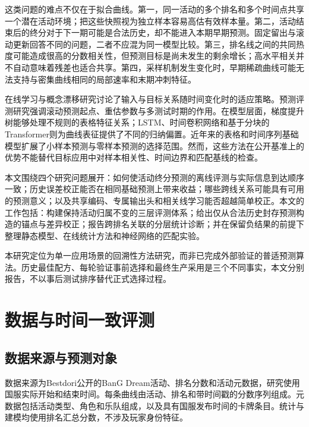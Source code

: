 \documentclass[a4paper,11pt,fontset=none]{ctexart}
\begin{document}
这类问题的难点不仅在于拟合曲线。第一，同一活动的多个排名和多个时间点共享一个潜在活动环境；把这些快照视为独立样本容易高估有效样本量。第二，活动结束后的终分对于下一期可能是合法历史，却不能进入本期早期预测。固定留出与滚动更新回答不同的问题，二者不应混为同一模型比较。第三，排名线之间的共同热度可能造成很高的分数相关性，但预测目标是尚未发生的剩余增长；高水平相关并不自动意味着残差也适合共享。第四，采样机制发生变化时，早期稀疏曲线可能无法支持与密集曲线相同的局部速率和末期冲刺特征。

在线学习与概念漂移研究讨论了输入与目标关系随时间变化时的适应策略\citep{gama2014drift}。预测评测研究强调滚动预测起点、重估参数与多测试时期的作用\citep{tashman2000evaluation,cerqueira2020evaluation}。在模型层面，梯度提升树能够处理不规则的表格特征关系\citep{prokhorenkova2018catboost,chen2016xgboost}；LSTM、时间卷积网络和基于分块的Transformer则为曲线表征提供了不同的归纳偏置\citep{hochreiter1997lstm,bai2018tcn,nie2023patchtst}。近年来的表格和时间序列基础模型扩展了小样本预测与零样本预测的选择范围\citep{hollmann2025tabpfn,das2024timesfm,ansari2025chronos2}。然而，这些方法在公开基准上的优势不能替代目标应用中对样本相关性、时间边界和匹配基线的检查\citep{grinsztajn2022tabular}。

本文围绕四个研究问题展开：如何使活动终分预测的离线评测与实际信息到达顺序一致；历史误差校正能否在相同基础预测上带来收益；哪些跨线关系可能具有可用的预测意义；以及共享编码、专属输出头和相关线学习能否超越简单校正。本文的工作包括：构建保持活动归属不变的三层评测体系；给出仅从合法历史封存预测构造的锚点与差异校正；报告跨排名关联的分层统计诊断；并在保留负结果的前提下整理静态模型、在线统计方法和神经网络的匹配实验。

本研究定位为单一应用场景的回溯性方法研究，而非已完成外部验证的普适预测算法。历史最佳配方、每轮验证事前选择和最终生产采用是三个不同事实，本文分别报告，不以事后测试排序替代正式选择过程。

\section{数据与时间一致评测}

\subsection{数据来源与预测对象}

数据来源为Bestdori公开的BanG Dream活动、排名分数和活动元数据\citep{bestdori2026data}，研究使用国服实际开始和结束时间。每条曲线由活动、排名和带时间戳的分数序列组成。元数据包括活动类型、角色和乐队组成，以及具有国服发布时间的卡牌条目。统计与建模均使用排名汇总分数，不涉及玩家身份特征。
\end{document}
